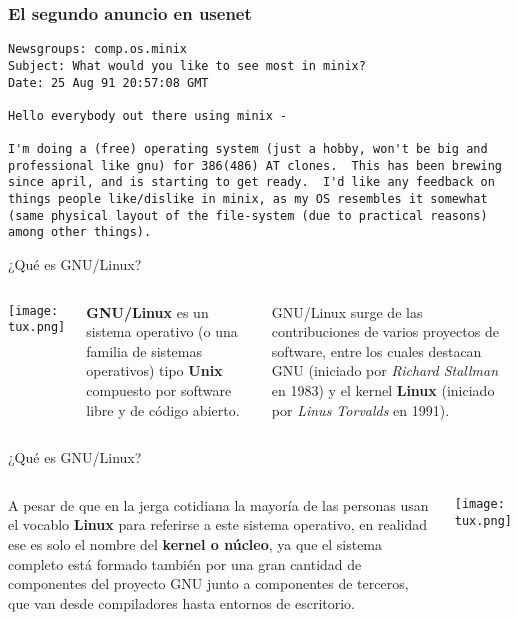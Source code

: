 \begin{frame}[fragile]
  \frametitle{El segundo anuncio en usenet}
  \begin{block}{}
  \begin{verbatim}
Newsgroups: comp.os.minix
Subject: What would you like to see most in minix?
Date: 25 Aug 91 20:57:08 GMT

Hello everybody out there using minix -

I'm doing a (free) operating system (just a hobby, won't be big and
professional like gnu) for 386(486) AT clones.  This has been brewing
since april, and is starting to get ready.  I'd like any feedback on
things people like/dislike in minix, as my OS resembles it somewhat
(same physical layout of the file-system (due to practical reasons)
among other things).
  \end{verbatim}
  \end{block}
\end{frame}

\begin{frame}[c]{¿Qué es GNU/Linux?}
    \begin{columns}
        \begin{center}
            \texttt{[image: tux.png]}
        \end{center}
        \textbf{GNU/Linux} es un sistema operativo (o una familia de sistemas
        operativos) tipo \textbf{Unix} compuesto por software libre y de código
        abierto.

        GNU/Linux surge de las contribuciones de varios proyectos
        de software, entre los cuales destacan GNU (iniciado por \emph{Richard
        Stallman} en 1983) y el kernel \textbf{Linux} (iniciado
        por \emph{Linus Torvalds} en 1991).
    \end{columns}
\end{frame}

\begin{frame}[c]{¿Qué es GNU/Linux?}
    \begin{columns}
        A pesar de que en la jerga cotidiana la mayoría de las personas usan
        el vocablo \textbf{Linux} para referirse a este sistema operativo, en
        realidad ese es solo el nombre del \textbf{kernel o núcleo}, ya que
        el sistema completo está formado también por una gran cantidad de
        componentes del proyecto GNU junto a componentes de terceros, que
        van desde compiladores hasta entornos de escritorio.
        \begin{center}
            \texttt{[image: tux.png]}
        \end{center}
    \end{columns}
\end{frame}

